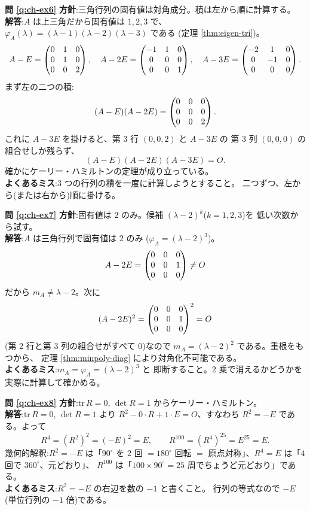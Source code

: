 \bigskip
\noindent\textbf{問 \ref{q:ch-ex6}}\quad
\textbf{方針}:三角行列の固有値は対角成分。積は左から順に計算する。\\
\textbf{解答}:$A$ は上三角だから固有値は $1, 2, 3$ で、
$\varphi_A(\lambda) = (\lambda - 1)(\lambda - 2)(\lambda - 3)$ である
(定理 \ref{thm:eigen-tri})。
\[
A - E = \begin{pmatrix}0 & 1 & 0 \\ 0 & 1 & 0 \\ 0 & 0 & 2\end{pmatrix}, \quad
A - 2E = \begin{pmatrix}-1 & 1 & 0 \\ 0 & 0 & 0 \\ 0 & 0 & 1\end{pmatrix}, \quad
A - 3E = \begin{pmatrix}-2 & 1 & 0 \\ 0 & -1 & 0 \\ 0 & 0 & 0\end{pmatrix}.
\]
まず左の二つの積:
\[
(A - E)(A - 2E) = \begin{pmatrix}0 & 0 & 0 \\ 0 & 0 & 0 \\ 0 & 0 & 2\end{pmatrix}.
\]
これに $A - 3E$ を掛けると、第 $3$ 行 $(0, 0, 2)$ と $A - 3E$ の
第 $3$ 列 $(0, 0, 0)$ の組合せしか残らず、
\[
(A - E)(A - 2E)(A - 3E) = O.
\]
確かにケーリー・ハミルトンの定理が成り立っている。\\
\textbf{よくあるミス}:$3$ つの行列の積を一度に計算しようとすること。
二つずつ、左から(または右から)順に掛ける。

\bigskip
\noindent\textbf{問 \ref{q:ch-ex7}}\quad
\textbf{方針}:固有値は $2$ のみ。候補 $(\lambda - 2)^k$($k = 1, 2, 3$)を
低い次数から試す。\\
\textbf{解答}:$A$ は三角行列で固有値は $2$ のみ
($\varphi_A = (\lambda - 2)^3$)。
\[
A - 2E = \begin{pmatrix}0 & 0 & 0 \\ 0 & 0 & 1 \\ 0 & 0 & 0\end{pmatrix} \neq O
\]
だから $m_A \neq \lambda - 2$。次に
\[
(A - 2E)^2 = \begin{pmatrix}0 & 0 & 0 \\ 0 & 0 & 1 \\ 0 & 0 & 0\end{pmatrix}^2 = O
\]
(第 $2$ 行と第 $3$ 列の組合せがすべて $0$)なので
$m_A = (\lambda - 2)^2$ である。重根をもつから、
定理 \ref{thm:minpoly-diag} により対角化不可能である。\\
\textbf{よくあるミス}:$m_A = \varphi_A = (\lambda - 2)^3$ と
即断すること。$2$ 乗で消えるかどうかを実際に計算して確かめる。

\bigskip
\noindent\textbf{問 \ref{q:ch-ex8}}\quad
\textbf{方針}:$\mathrm{tr}\,R = 0$, $\det R = 1$ からケーリー・ハミルトン。\\
\textbf{解答}:$\mathrm{tr}\,R = 0$, $\det R = 1$ より
$R^2 - 0 \cdot R + 1 \cdot E = O$、すなわち $R^2 = -E$ である。よって
\[
R^4 = (R^2)^2 = (-E)^2 = E, \qquad
R^{100} = (R^4)^{25} = E^{25} = E.
\]
幾何的解釈:$R^2 = -E$ は「$90^\circ$ を $2$ 回 $= 180^\circ$ 回転
$=$ 原点対称」、$R^4 = E$ は「$4$ 回で $360^\circ$、元どおり」、
$R^{100}$ は「$100 \times 90^\circ = 25$ 周でちょうど元どおり」である。\\
\textbf{よくあるミス}:$R^2 = -E$ の右辺を数の $-1$ と書くこと。
行列の等式なので $-E$(単位行列の $-1$ 倍)である。

